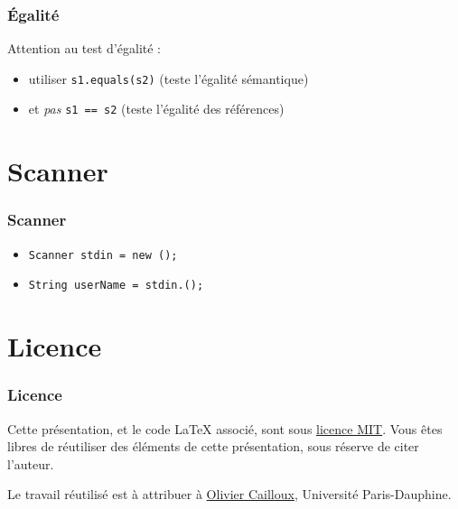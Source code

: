 \documentclass[english, french]{beamer}
\begin{document}
\begin{frame}
	\frametitle{Égalité}
	Attention au test d’égalité :
	\begin{itemize}
		\item[\mkkOK] utiliser \texttt{s1.equals(s2)} (teste l’égalité sémantique)
		\item[\mkkNO] et \emph{pas} \texttt{s1 == s2} (teste l’égalité des références)
	\end{itemize}
\end{frame}

\section{Scanner}
\begin{frame}
	\frametitle{Scanner}
	\begin{itemize}
		\item \texttt{Scanner stdin = new ();}
		\item \texttt{String userName = stdin.();}
	\end{itemize}
\end{frame}

\appendix

\section{Licence}
\begin{frame}
	\frametitle{Licence}
	Cette présentation, et le code LaTeX associé, sont sous \href{https://opensource.org/licenses/MIT}{licence MIT}. Vous êtes libres de réutiliser des éléments de cette présentation, sous réserve de citer l’auteur.
	
	Le travail réutilisé est à attribuer à \href{http://www.lamsade.dauphine.fr/~ocailloux/}{Olivier Cailloux}, Université Paris-Dauphine.
\end{frame}
\end{document}
